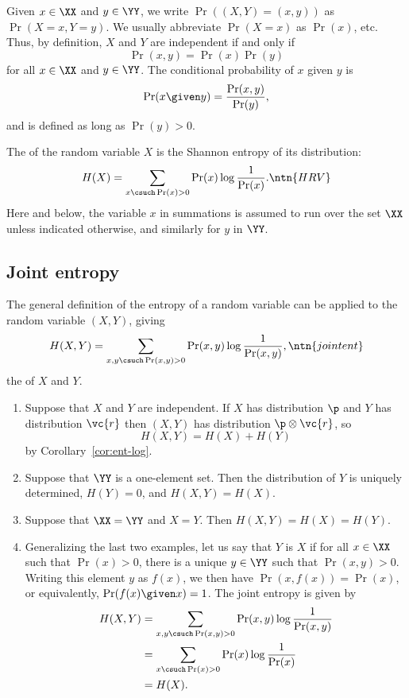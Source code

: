 Given $x \in \XX$ and $y \in \YY$, we write
$\Pr((X, Y) = (x, y))$ as $\Pr(X = x, Y = y)$.  We usually abbreviate
$\Pr(X = x)$ as $\Pr(x)$, etc.  Thus, by definition, $X$ and $Y$
are independent%
% 
% 
if and only if
\[
\Pr(x, y) = \Pr(x) \Pr(y)
\]
for all $x \in \XX$ and $y \in \YY$.  The 
% 
conditional%
%
% 
probability of $x$ 
given $y$ is
\[
\Pr(x \given y)
=
\frac{\Pr(x, y)}{\Pr(y)},
\]
and is defined as long as $\Pr(y) > 0$.  

The  of the random variable $X$ is the Shannon
entropy of its distribution:
\[
H(X) 
=
\sum_{x \csuch \Pr(x) > 0} \Pr(x) \log \frac{1}{\Pr(x)}.
\ntn{HRV}
\]
Here and below, the variable $x$ in summations is assumed to run over the
set $\XX$ unless indicated otherwise, and similarly for $y$ in $\YY$.

\subsection*{Joint entropy}

The general definition of the entropy of a random variable can
be applied to the random variable $(X, Y)$, giving
\[
H(X, Y)
=
\sum_{x, y \csuch \Pr(x, y) > 0}
\Pr(x, y) \log \frac{1}{\Pr(x, y)},
\ntn{jointent}
\]
the  of $X$ and $Y$.

\begin{examples}
\begin{enumerate}
\item
{}
Suppose that $X$ and $Y$ are independent.  If $X$ has distribution $\p$ and
$Y$ has distribution $\vc{r}$ then $(X, Y)$ has distribution $\p \otimes
\vc{r}$, so 
\[
H(X, Y) = H(X) + H(Y)
\]
by Corollary~\ref{cor:ent-log}.  

\item 
{}
Suppose that $\YY$ is a one-element set.  Then the distribution of $Y$ is
uniquely determined, $H(Y) = 0$, and $H(X, Y) = H(X)$.

\item
{}
Suppose that $\XX = \YY$ and $X = Y$.  Then $H(X, Y) = H(X) = H(Y)$.

\item
{}
Generalizing the last two examples, let us say that $Y$ is
 $X$ if for all $x \in \XX$ such that $\Pr(x) > 0$,
there is a unique $y \in \YY$ such that $\Pr(x, y) > 0$.  Writing this
element $y$ as $f(x)$, we then have $\Pr(x, f(x)) = \Pr(x)$, or
equivalently, $\Pr(f(x)\given x) = 1$.  The joint entropy is given by
% 
\begin{align*}
H(X, Y) &
=
\sum_{x, y \csuch \Pr(x, y) > 0} 
\Pr(x, y) \log \frac{1}{\Pr(x, y)}      \\
&
=
\sum_{x \csuch \Pr(x) > 0} \Pr(x) \log \frac{1}{\Pr(x)} \\
&
=
H(X).
\end{align*}
\end{enumerate}
\end{examples}


